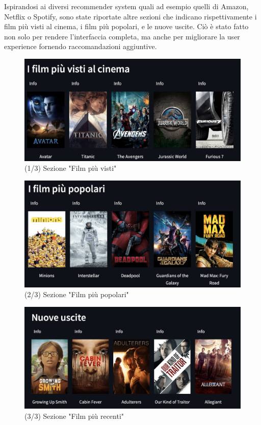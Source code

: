 \documentclass{report}
\begin{document}
        Ispirandosi ai diversi recommender system quali ad esempio quelli di Amazon, Netflix o Spotify, sono state riportate altre sezioni che indicano rispettivamente i film più visti al cinema, i film più popolari, e le nuove uscite. Ciò è stato fatto non solo per rendere l'interfaccia completa, ma anche per migliorare la user experience fornendo raccomandazioni aggiuntive.
        \begin{figure}[h]
            \centering
            \includegraphics[width=1\linewidth]{screenshot/sezioni_2.png}
            \caption{(1/3) Sezione "Film più visti"}
            \label{fig:enter-label}
        \end{figure}
        \begin{figure}[h]
            \centering
            \includegraphics[width=1\linewidth]{screenshot/sezioni_3.png}
            \caption{(2/3) Sezione "Film più popolari"}
            \label{fig:enter-label}
        \end{figure}
        \begin{figure}[h]
            \centering
            \includegraphics[width=1\linewidth]{screenshot/sezioni_4.png}
            \caption{(3/3) Sezione "Film più recenti"}
            \label{fig:enter-label}
        \end{figure}
        
\end{document}
